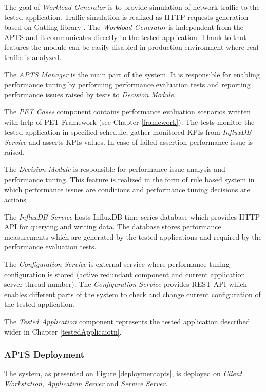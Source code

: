 \documentclass[10pt,a4paper]{article}
\begin{document}
The goal of \textit{Workload Generator} is to provide simulation of network traffic to the tested application. Traffic simulation is realized as HTTP requests generation based on Gatling library \cite{gatling}. The \textit{Workload Generator} is independent from the APTS and it communicates directly to the tested application. Thank to that features the module can be easily disabled in production environment where real traffic is analyzed.  

The \textit{APTS Manager} is the main part of the system. It is responsible for enabling performance tuning by performing performance evaluation tests and reporting performance issues raised by tests to \textit{Decision Module}. 

The \textit{PET Cases} component contains performance evaluation scenarios written with help of PET Framework (see Chapter \ref{framework}). The tests monitor the tested application in specified schedule, gather monitored KPIs from \textit{InfluxDB Service} and asserts KPIs values. In case of failed assertion performance issue is raised.

The \textit{Decision Module} is responsible for performance issue analysis and performance tuning. This feature is realized in the form of rule based system in which performance issues are conditions and performance tuning decisions are actions.   

The \textit{InfluxDB Service} hosts InfluxDB \cite{influxdb} time series database which provides HTTP API for querying and writing data. The database stores performance measurements which are generated by the tested applications and required by the performance evaluation tests. 

The \textit{Configuration Service} is external service where performance tuning configuration is stored (active redundant component and current application server thread number). The \textit{Configuration Service} provides REST API which enables different parts of the system to check and change current configuration of the tested application.

The \textit{Tested Application} component represents the tested application described      wider in Chapter \ref{testedApplicaiotn}.


\subsubsection{APTS Deployment}

The system, as presented on Figure \ref{deploymentapts}, is deployed on \textit{Client Workstation}, \textit{Application Server} and \textit{Service Server}. 
\end{document}

